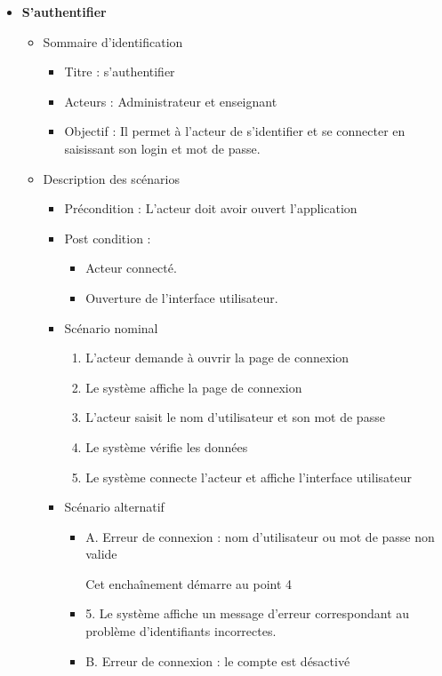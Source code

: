 \begin{itemize}
	\item \textbf{S’authentifier}
	\begin{itemize}
		\item Sommaire d’identification
		\begin{itemize}
			\item Titre : s’authentifier
			\item Acteurs : Administrateur et enseignant 
			\item Objectif : Il permet à l’acteur de s’identifier et se connecter en saisissant son login et mot de passe.
		\end{itemize}
		\item Description des scénarios
		\begin{itemize}
			\item Précondition : L’acteur doit avoir ouvert l’application 
			\item Post condition :
			\begin{itemize}
				\item Acteur connecté.  
				\item Ouverture de l’interface utilisateur.
			\end{itemize}
			\item Scénario nominal 
			\begin{enumerate}
				\item L’acteur demande à ouvrir la page de connexion  
				\item Le système affiche la page de connexion
				\item L’acteur saisit le nom d’utilisateur et son mot de passe 
				\item Le système vérifie les données 
				\item Le système connecte l’acteur et affiche l’interface utilisateur 
			\end{enumerate}
			\item Scénario alternatif
			\begin{itemize}
				\item A. Erreur de connexion : nom d'utilisateur ou mot de passe non valide
				
				Cet enchaînement démarre au point 4 

				\item 5. Le système affiche un message d’erreur correspondant au problème d’identifiants incorrectes.
				\item B. Erreur de connexion : le compte est désactivé


\end{itemize}
\end{itemize}
\end{itemize}
\end{itemize}
